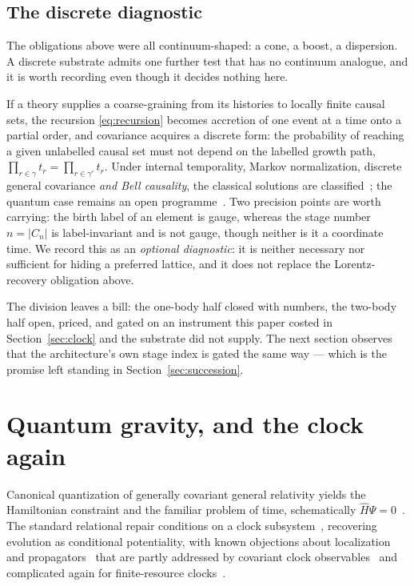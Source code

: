 \documentclass[11pt,a4paper]{article}
\theoremstyle{definition}
\theoremstyle{plain}
\theoremstyle{remark}
\begin{document}
\subsection{The discrete diagnostic}
\label{sec:diagnostic}

The obligations above were all continuum-shaped: a cone, a boost, a
dispersion. A discrete substrate admits one further test that has no
continuum analogue, and it is worth recording even though it decides
nothing here.

If a theory supplies a coarse-graining from its histories to locally
finite causal sets, the recursion \eqref{eq:recursion} becomes accretion
of one event at a time onto a partial order, and covariance acquires a
discrete form: the probability of reaching a given unlabelled causal set
must not depend on the labelled growth path,
$\prod_{r\in\gamma}t_r = \prod_{r\in\gamma'}t_r$. Under internal
temporality, Markov normalization, discrete general covariance
\emph{and Bell causality}, the classical solutions are
classified~\cite{rideoutsorkin}; the quantum case remains an open
programme~\cite{sorkin,srivastavasurya}. Two precision points are worth
carrying: the birth label of an element is gauge, whereas the stage
number $n = |C_n|$ is label-invariant and is not gauge, though neither is
it a coordinate time. We record this as an \emph{optional diagnostic}: it
is neither necessary nor sufficient for hiding a preferred lattice, and
it does not replace the Lorentz-recovery obligation above.

The division leaves a bill: the one-body half closed with numbers, the
two-body half open, priced, and gated on an instrument this paper costed
in Section~\ref{sec:clock} and the substrate did not supply. The next
section observes that the architecture's own stage index is gated the
same way --- which is the promise left standing in
Section~\ref{sec:succession}.

\section{Quantum gravity, and the clock again}
\label{sec:qg}

Canonical quantization of generally covariant general relativity yields
the Hamiltonian constraint and the familiar problem of time,
schematically $\hat{H}\Psi = 0$~\cite{dewitt}. The standard
relational repair conditions on a clock subsystem~\cite{pagewootters},
recovering evolution as conditional potentiality, with known objections
about localization and propagators~\cite{kuchar} that are partly
addressed by covariant clock observables~\cite{hohn} and complicated
again for finite-resource clocks~\cite{hausmann}.
\end{document}
